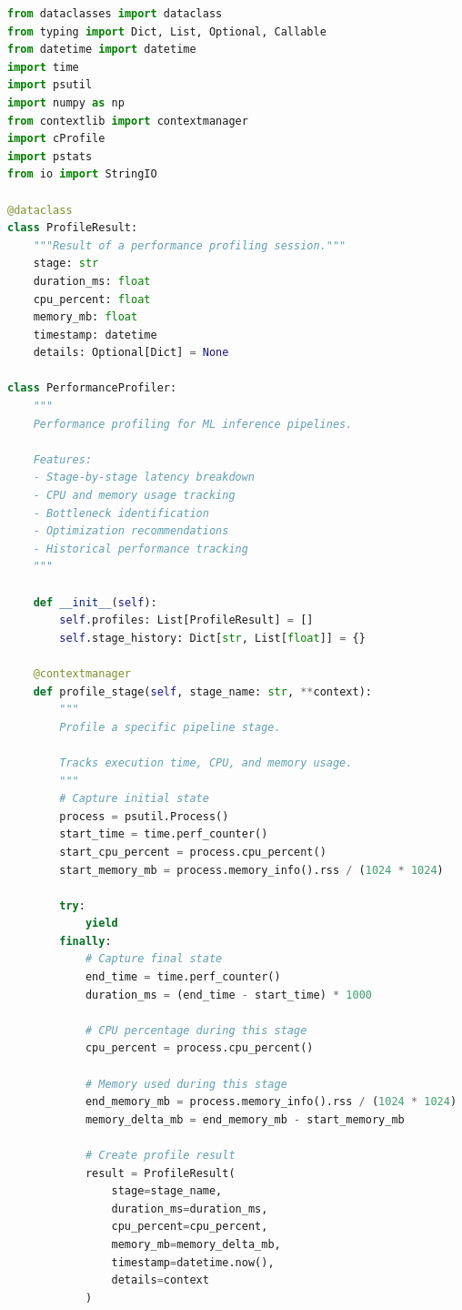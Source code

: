 \begin{lstlisting}[language=Python, caption={PerformanceProfiler for ML Pipelines}]
from dataclasses import dataclass
from typing import Dict, List, Optional, Callable
from datetime import datetime
import time
import psutil
import numpy as np
from contextlib import contextmanager
import cProfile
import pstats
from io import StringIO

@dataclass
class ProfileResult:
    """Result of a performance profiling session."""
    stage: str
    duration_ms: float
    cpu_percent: float
    memory_mb: float
    timestamp: datetime
    details: Optional[Dict] = None

class PerformanceProfiler:
    """
    Performance profiling for ML inference pipelines.

    Features:
    - Stage-by-stage latency breakdown
    - CPU and memory usage tracking
    - Bottleneck identification
    - Optimization recommendations
    - Historical performance tracking
    """

    def __init__(self):
        self.profiles: List[ProfileResult] = []
        self.stage_history: Dict[str, List[float]] = {}

    @contextmanager
    def profile_stage(self, stage_name: str, **context):
        """
        Profile a specific pipeline stage.

        Tracks execution time, CPU, and memory usage.
        """
        # Capture initial state
        process = psutil.Process()
        start_time = time.perf_counter()
        start_cpu_percent = process.cpu_percent()
        start_memory_mb = process.memory_info().rss / (1024 * 1024)

        try:
            yield
        finally:
            # Capture final state
            end_time = time.perf_counter()
            duration_ms = (end_time - start_time) * 1000

            # CPU percentage during this stage
            cpu_percent = process.cpu_percent()

            # Memory used during this stage
            end_memory_mb = process.memory_info().rss / (1024 * 1024)
            memory_delta_mb = end_memory_mb - start_memory_mb

            # Create profile result
            result = ProfileResult(
                stage=stage_name,
                duration_ms=duration_ms,
                cpu_percent=cpu_percent,
                memory_mb=memory_delta_mb,
                timestamp=datetime.now(),
                details=context
            )


\end{lstlisting}
